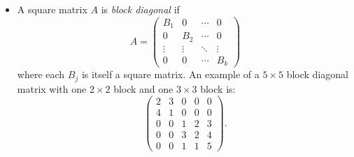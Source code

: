 \documentclass{ximera}
\begin{document}
\begin{itemize}
\item A square matrix $A$ is {\em block diagonal\/}
 if
\[
A = \left(\begin{array}{cccc} B_1 & 0 & \cdots & 0 \\
0 & B_2 & \cdots & 0 \\ \vdots & \vdots & \ddots & \vdots \\
0 & 0 & \cdots & B_k \end{array} \right)
\]
where each $B_j$ is itself a square matrix. An example of a $5\times 5$
block diagonal matrix with one $2\times 2$ block and one $3\times 3$ block is:
\[
\left(\begin{array}{ccccc} 2 & 3 & 0 & 0 & 0\\ 4 & 1 & 0 & 0 & 0\\
0 & 0 & 1 & 2 & 3\\ 0 & 0 & 3 & 2 & 4\\ 0 & 0 & 1 & 1 & 5\end{array}\right).
\]


\end{itemize}



\end{document}
